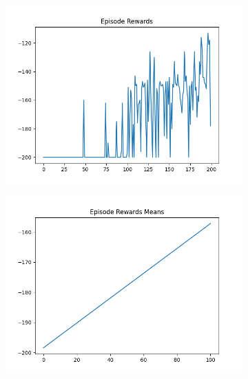 \begin{figure}[H]
\begin{subfigure}{.47\linewidth}
        \includegraphics[width=\textwidth]{mountain/2024-06-15_16-46-16_dqn_mountaincar_episode_rewards.png}
    \end{subfigure}
    \begin{subfigure}{.47\linewidth}
        \centering
        \includegraphics[width=\textwidth]{mountain/2024-06-15_16-46-16_dqn_mountaincar_episode_rewards_means.png}
    \end{subfigure}
\end{figure}
